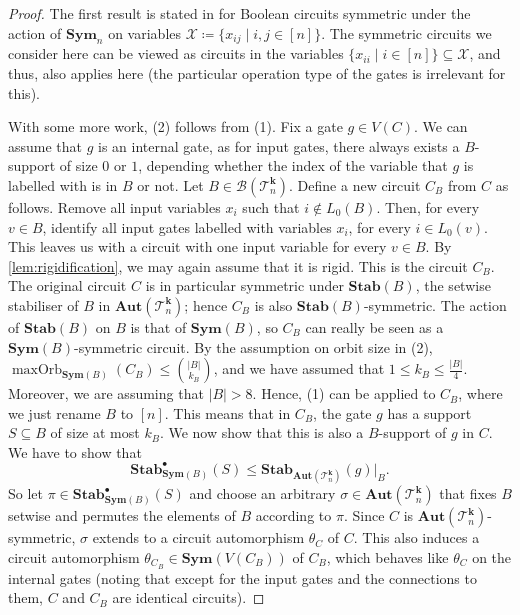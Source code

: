 \documentclass[11pt]{article}
\newcommand{\Aut}{\mathbf{Aut}}
\newcommand{\Sym}{\mathbf{Sym}}
\newcommand{\Stab}{\mathbf{Stab}}
\newcommand{\StabP}{\mathbf{Stab}^{\bullet}}
\newcommand{\Bb}{{\mathcal B}}
\newcommand{\Tt}{{\mathcal T}}
\newcommand{\Xx}{{\mathcal X}}
\theoremstyle{definition}
\theoremstyle{plain}
\theoremstyle{remark}
\theoremstyle{remark}
\newcommand{\maxorb}{\operatorname{maxOrb}}
\begin{document}
\supportsizes*
\begin{proof}
	The first result is stated in \cite[Theorem 14]{dawar_symmetric_2024} for Boolean circuits symmetric under the action of $\Sym_n$ on variables $\Xx \coloneqq \{x_{ij} \mid i,j \in [n]\}$. The symmetric circuits we consider here can be viewed as circuits in the variables $\{x_{ii} \mid i \in [n]\} \subseteq \Xx$, and thus, \cite[Theorem 14]{dawar_symmetric_2024} also applies here (the particular operation type of the gates is irrelevant for this).
	
	With some more work, (2) follows from (1). Fix a gate $g \in V(C)$. We can assume that $g$ is an internal gate, as for input gates, there always exists a $B$-support of size $0$ or $1$, depending whether the index of the variable that $g$ is labelled with is in $B$ or not.  
	Let $B \in \Bb(\Tt_n^{\boldsymbol{k}})$. Define a new circuit $C_B$ from $C$ as follows.	 
	Remove all input variables $x_i$ such that $i \notin L_0(B)$. Then, for every $v \in B$, identify all input gates labelled with variables $x_i$, for every $i \in L_0(v)$. This leaves us with a circuit with one input variable for every $v \in B$. 
	By \cref{lem:rigidification}, we may again assume that it is rigid.  
	This is the circuit $C_B$. The original circuit $C$ is in particular symmetric under $\Stab(B)$, the setwise stabiliser of $B$ in $\Aut(\Tt_n^{\boldsymbol{k}})$; hence $C_B$ is also $\Stab(B)$-symmetric. The action of $\Stab(B)$ on $B$ is that of $\Sym(B)$, so $C_B$ can really be seen as a $\Sym(B)$-symmetric circuit.
	By the assumption on orbit size in (2), $\maxorb_{\Sym(B)}(C_B) \leq \binom{|B|}{k_B}$, and we have assumed that $1 \leq k_B \leq \frac{|B|}{4}$. Moreover, we are assuming that $|B| > 8$. Hence, (1) can be applied to $C_B$, where we just rename $B$ to $[n]$. This means that in $C_B$, the gate $g$ has a support $S \subseteq B$ of size at most $k_B$. We now show that this is also a $B$-support of $g$ in $C$.
	We have to show that \[
	\StabP_{\Sym(B)}(S) \leq \Stab_{\Aut(\Tt_n^{\boldsymbol{k}})}(g)|_B. 
	\]
	So let $\pi \in\StabP_{\Sym(B)}(S)$ and choose an arbitrary $\sigma \in \Aut(\Tt_n^{\boldsymbol{k}})$ that fixes $B$ setwise and permutes the elements of $B$ according to $\pi$. Since $C$ is $\Aut(\Tt_n^{\boldsymbol{k}})$-symmetric, $\sigma$ extends to a circuit automorphism $\theta_C$ of $C$. This also induces a circuit automorphism $\theta_{C_B} \in \Sym(V(C_B))$ of $C_B$, which behaves like $\theta_C$ on the internal gates (noting that except for the input gates and the connections to them, $C$ and $C_B$ are identical circuits). 

\end{proof}
\end{document}

